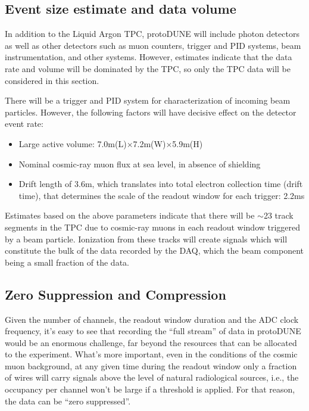 

\subsection{Event size estimate and data volume}
\label{sec:protodune-data-volume}
In addition to the Liquid Argon TPC, protoDUNE will include photon detectors as well as other detectors such as muon counters, trigger and PID systems,
beam instrumentation, and other systems.
However, estimates indicate that the data rate and volume will be dominated by the TPC, so only the TPC data will be considered in this section.


There will be a trigger and PID system for characterization of incoming beam particles. However, the following factors will have decisive effect on the detector event rate:
\begin{itemize}
\item Large active volume: 7.0m(L)$\times$7.2m(W)$\times$5.9m(H)
\item Nominal cosmic-ray muon flux at sea level, in absence of shielding
\item Drift length of 3.6m, which translates into total electron collection time (drift time), that  determines the scale of the readout window for each trigger: 2.2ms
\end{itemize}

Estimates based on the above parameters indicate that there will be $\sim$23 track segments in the TPC due to cosmic-ray muons in each readout window
triggered by a beam particle. Ionization from these tracks will create signals which will constitute the bulk of the data recorded by the DAQ, which the beam
component being a small fraction of the data.


\subsection{Zero Suppression and Compression}
\label{sec:protodune-zs}
Given the number of channels, the readout window duration and the ADC clock frequency, it's easy to see that recording the ``full stream'' of data
in protoDUNE would be an enormous challenge, far beyond the resources that can be allocated to the experiment. What's more important,
even in the conditions of the cosmic muon background, at any given time during the readout window only a fraction of wires will carry signals
above the level of natural radiological sources, i.e., the occupancy per channel won't be large if a threshold is applied. For that reason, the data can be ``zero suppressed''.


